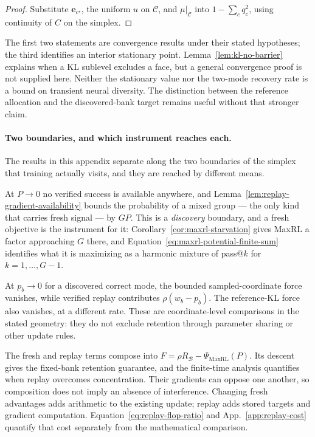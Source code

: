 \documentclass{article}
\newcommand{\enforcehalffinalproseline}{%
  \setlength{\parfillskip}{0pt plus .20\linewidth}}
\newcommand{\1}{\mathbf 1}
\theoremstyle{remark}
\theoremstyle{definition}
\theoremstyle{plain}
\begin{document}
\begin{proof}
\enforcehalffinalproseline
Substitute $\mathbf e_{c^\star}$, the uniform $u$ on $\mathcal C$, and
$\mu|_{\mathcal C}$ into $1-\sum_cq_c^2$, using continuity of $C$ on the
simplex.
\end{proof}

The first two statements are convergence results under their stated
hypotheses; the third identifies an interior stationary point.
Lemma~\ref{lem:kl-no-barrier} explains when a KL sublevel excludes a face,
but a general convergence proof is not supplied here.
Neither the stationary value nor the two-mode recovery rate is a bound on
transient neural diversity. The distinction between the reference allocation
and the discovered-bank target remains useful without that stronger claim.

\paragraph{Two boundaries, and which instrument reaches each.}
The results in this appendix separate along the two boundaries of the simplex
that training actually visits, and they are reached by different means.

At $P\to0$ no verified success is available anywhere, and
Lemma~\ref{lem:replay-gradient-availability} bounds the probability of a
mixed group --- the only kind that carries fresh signal --- by $GP$. This is a
\emph{discovery} boundary, and a fresh objective is the instrument for it:
Corollary~\ref{cor:maxrl-starvation} gives MaxRL a factor approaching $G$
there, and Equation~\eqref{eq:maxrl-potential-finite-sum} identifies what it
is maximizing as a harmonic mixture of pass@$k$ for $k=1,\ldots,G-1$.

At $p_b\to0$ for a discovered correct mode, the bounded sampled-coordinate
force vanishes, while verified replay contributes $\rho(w_b-p_b)$.
The reference-KL force also vanishes, at a different rate.
These are coordinate-level comparisons in the stated geometry: they do not
exclude retention through parameter sharing or other update rules.

The fresh and replay terms compose into
$F=\rho R_{\mathcal B}-\Psi_{\mathrm{MaxRL}}(P)$.
Its descent gives the fixed-bank retention guarantee, and the finite-time
analysis quantifies when replay overcomes concentration. Their gradients can
oppose one another, so composition does not imply an absence of interference.
Changing fresh advantages adds arithmetic to the existing update; replay adds
stored targets and gradient computation. Equation~\eqref{eq:replay-flop-ratio}
and App.~\ref{app:replay-cost} quantify that cost separately from the
mathematical comparison.
\end{document}
